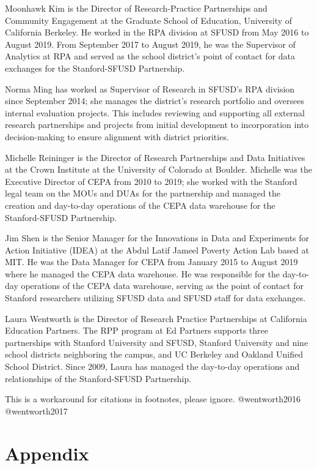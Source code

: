 \documentclass[
]{book}
\begin{document}
Moonhawk Kim is the Director of Research-Practice Partnerships and Community Engagement at the Graduate School of Education, University of California Berkeley. He worked in the RPA division at SFUSD from May 2016 to August 2019. From September 2017 to August 2019, he was the Supervisor of Analytics at RPA and served as the school district's point of contact for data exchanges for the Stanford-SFUSD Partnership.

Norma Ming has worked as Supervisor of Research in SFUSD's RPA division since September 2014; she manages the district's research portfolio and oversees internal evaluation projects. This includes reviewing and supporting all external research partnerships and projects from initial development to incorporation into decision-making to ensure alignment with district priorities.

Michelle Reininger is the Director of Research Partnerships and Data Initiatives at the Crown Institute at the University of Colorado at Boulder. Michelle was the Executive Director of CEPA from 2010 to 2019; she worked with the Stanford legal team on the MOUs and DUAs for the partnership and managed the creation and day-to-day operations of the CEPA data warehouse for the Stanford-SFUSD Partnership.

Jim Shen is the Senior Manager for the Innovations in Data and Experiments for Action Initiative (IDEA) at the Abdul Latif Jameel Poverty Action Lab based at MIT. He was the Data Manager for CEPA from January 2015 to August 2019 where he managed the CEPA data warehouse. He was responsible for the day-to-day operations of the CEPA data warehouse, serving as the point of contact for Stanford researchers utilizing SFUSD data and SFUSD staff for data exchanges.

Laura Wentworth is the Director of Research Practice Partnerships at California Education Partners. The RPP program at Ed Partners supports three partnerships with Stanford University and SFUSD, Stanford University and nine school districts neighboring the campus, and UC Berkeley and Oakland Unified School District. Since 2009, Laura has managed the day-to-day operations and relationships of the Stanford-SFUSD Partnership.

\begin{invisible}
This is a workaround for citations in footnotes, please ignore.
@wentworth2016 @wentworth2017
\end{invisible}

\hypertarget{appendix-5}{%
\section*{Appendix}\label{appendix-5}}
\end{document}
